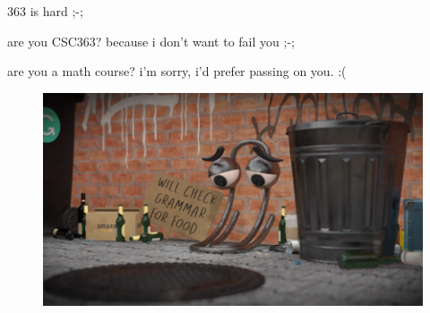 \documentclass{beamer}
\begin{document}
\begin{frame}{363 is hard ;-;}

{\color{red} are you CSC363? because i don't want to fail you ;-;}

\vspace{2mm}

{\color{blue} are you a math course? i'm sorry, i'd prefer passing on you. :(}

\vspace{2mm}

\begin{figure}[h]
\includegraphics[scale=0.35]{img/grammar.png}
\end{figure}

\end{frame}
\end{document}
